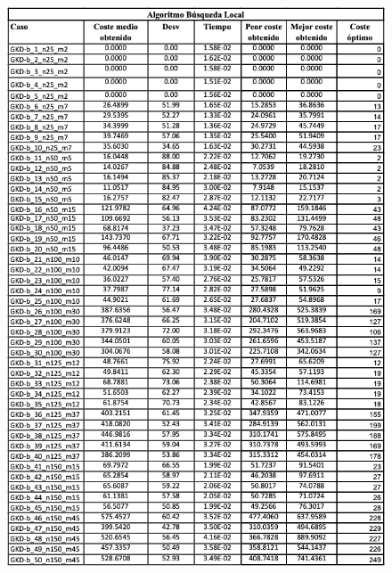 \begin{figure}[H] %
    \centering
        \includegraphics[scale=0.65]{img/bl.png}
\end{figure}




